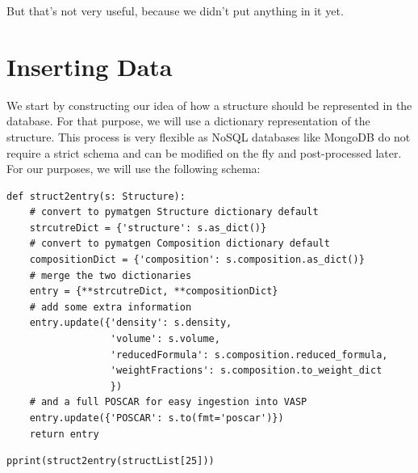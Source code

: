 But that's not very useful, because we didn't put anything in it yet.

\hypertarget{inserting-data}{%
\section{Inserting Data}\label{pysipfenntutorial:inserting-data}}

We start by constructing our idea of how a structure should be
represented in the database. For that purpose, we will use a dictionary
representation of the structure. This process is very flexible as NoSQL
databases like MongoDB do not require a strict schema and can be
modified on the fly and post-processed later. For our purposes, we will
use the following schema:

\begin{verbatim}
def struct2entry(s: Structure):
    # convert to pymatgen Structure dictionary default
    strcutreDict = {'structure': s.as_dict()} 
    # convert to pymatgen Composition dictionary default
    compositionDict = {'composition': s.composition.as_dict()} 
    # merge the two dictionaries
    entry = {**strcutreDict, **compositionDict} 
    # add some extra information
    entry.update({'density': s.density,
                  'volume': s.volume,
                  'reducedFormula': s.composition.reduced_formula,
                  'weightFractions': s.composition.to_weight_dict
                  }) 
    # and a full POSCAR for easy ingestion into VASP
    entry.update({'POSCAR': s.to(fmt='poscar')})
    return entry
\end{verbatim}

\begin{verbatim}
pprint(struct2entry(structList[25]))
\end{verbatim}

